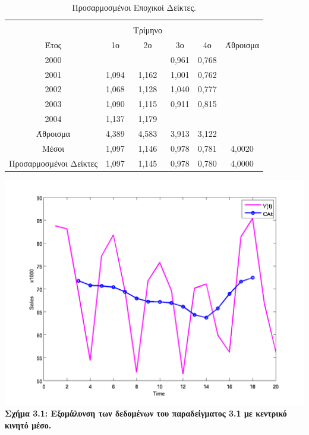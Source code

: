 \begin{table} [h]
\begin{center}
\begin{tabular}{|c|c|c|c|c|c|c|c|}
      \hline
    \end{tabular}
  \end{center}
\end{table}

\begin{table} [h]
  \caption{Προσαρμοσμένοι Εποχικοί Δείκτες.} 
  \label{tab_2}
  \begin{center}
    \begin{tabular}{|c|c c c c|c|}
      \hline
      &  &  &  &  &\\
      &  &  Τρίμηνο &  &  & \\
   Έτος   & 1ο & 2ο & 3ο  & 4ο  & Άθροισμα \\
   \hline \hline
   2000&   &  & 0,961 &0,768  &  \\
   2001  &1,094  & 1,162 & 1,001 &0,762 &  \\
   2002& 1,068 & 1,128 & 1,040 & 0,777 &  \\
    2003& 1,090 & 1,115 & 0,911 & 0,815 &  \\  
    2004& 1,137 & 1,179 &  &  &  \\
    \hline
    Άθροισμα & 4,389 & 4,583 &3,913  & 3,122 &  \\
    Μέσοι& 1,097 & 1,146 & 0,978 & 0,781 & 4,0020 \\
    Προσαρμοσμένοι Δείκτες& 1,097 &1,145 & 0,978 & 0,780 & 4,0000 \\
      \hline
    \end{tabular}
  \end{center}
\end{table}

\begin{center} 
\includegraphics[scale=0.7]{graff2.png}\\   
\textbf{Σχήμα 3.1: Εξομάλυνση των δεδομένων του παραδείγματος 3.1 με κεντρικό κινητό μέσο.}
\end{center} 


